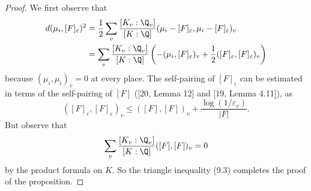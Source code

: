 \begin{proof}
We first observe that
\begin{align*}
d(\mu_i,[F]_{\varepsilon})^2&=\frac12\sum_v\frac{[K_v:\Q_v]}{[K:\Q]}(\mu_i-[F]_{\varepsilon},\mu_i-[F]_{\varepsilon})_v\\
&=\sum_v\frac{[K_v:\Q_v]}{[K:\Q]}\left(-(\mu_i,[F]_{\varepsilon})_v+\frac12([F]_{\varepsilon},[F]_{\varepsilon})_v\right)
\end{align*}
because $(\mu_i,\mu_i)_v=0$ at every place. The self-pairing of $[F]_{\varepsilon}$ can be estimated in terms of the self-pairing of $[F]$ ([20, Lemma 12] and [19, Lemma 4.11]), as
\[
([F]_{\varepsilon},[F]_{\varepsilon})_v\leq([F],[F])_v+\frac{\log(1/\varepsilon_v)}{|F|}.
\]
But observe that
\[
\sum_v\frac{[K_v:\Q_v]}{[K:\Q]}([F],[F])_v=0
\]
by the product formula on $K$. So the triangle inequality (9.3) completes the proof of the proposition.
\end{proof}
